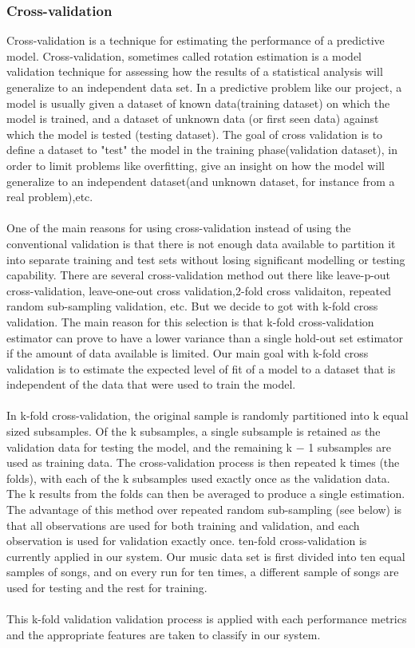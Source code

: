{\subsubsection{Cross-validation}
Cross-validation is a technique for estimating the performance of a predictive model.
Cross-validation, sometimes called rotation estimation is a model validation technique for assessing how the
results of a statistical analysis will generalize to an independent data set. In a predictive problem like our project, a model is usually given a dataset of known data(training dataset) on which 
the model is trained, and a dataset of unknown data (or first seen data) against which the model is tested (testing dataset). The goal of cross validation is to define a dataset
to "test" the model in the training phase(validation dataset), in order to limit problems like overfitting, give an insight on how the model will generalize to an independent dataset(and unknown dataset, for instance from 
a real problem),etc.\\
\\
One of the main reasons for using cross-validation instead of using the conventional validation is that there is not enough data available to partition it into separate training and test sets without losing
significant modelling or testing capability. There are several cross-validation method out there like leave-p-out cross-validation, leave-one-out cross validation,2-fold cross validaiton, repeated random 
sub-sampling validation, etc. But we decide to got with k-fold cross validation. The main reason for this selection is that k-fold cross-validation estimator can prove to have a lower variance than a single hold-out set 
estimator if the amount of data available is limited. Our main goal with k-fold cross validation is to estimate the expected level of fit of a model to a dataset that is independent of the data that were
used to train the model.\\
\\
In k-fold cross-validation, the original sample is randomly partitioned into k equal sized subsamples. Of the k subsamples,
a single subsample is retained as the validation data for testing the model, and the remaining k − 1 subsamples are used as training
data. The cross-validation process is then repeated k times (the folds), with each of the k subsamples used exactly once as the validation data. The k results from the
folds can then be averaged to produce a single estimation. The advantage of this method over repeated random sub-sampling (see below) is that all
observations are used for both training and validation, and each observation is used for validation exactly once. ten-fold cross-validation is currently
applied in our system. Our music data set is first divided into ten equal samples of songs, and on every run for ten times, a different sample of songs are used for
testing and the rest for training.\\
\\
This k-fold validation validation process is applied with each performance metrics and the appropriate features are taken to classify in our system.

}

